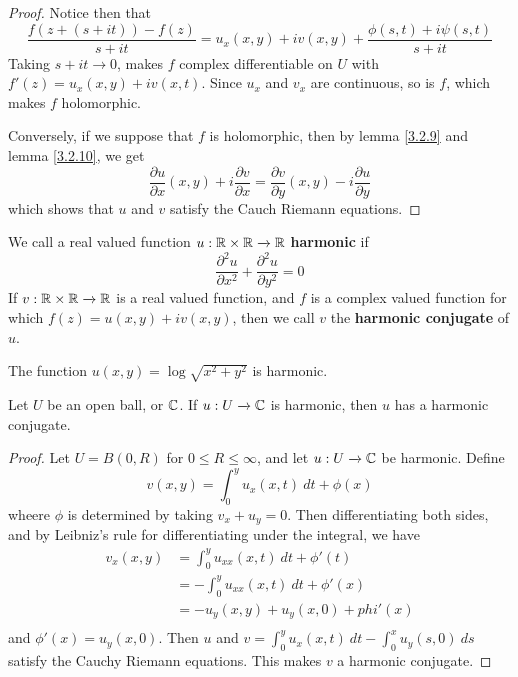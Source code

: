 \begin{proof}
    Notice then that
    \begin{equation*}
        \frac{f(z+(s+it))-f(z)}{s+it}=u_x(x,y)+iv(x,y)+\frac{\phi(s,t)+i\psi(s,t)}{s+it}
    \end{equation*}
    Taking $s+it \xrightarrow{} 0$, makes $f$ complex differentiable on $U$ with
    $f'(z)=u_x(x,y)+iv(x,t)$. Since $u_x$ and  $v_x$ are continuous, so is  $f$,
    which makes  $f$ holomorphic.

    Conversely, if we suppose that  $f$ is holomorphic, then by lemma \ref{3.2.9}
    and lemma \ref {3.2.10}, we get
    \begin{equation*}
        \frac{\partial{u}}{\partial{x}}(x,y)+i\frac{\partial{v}}{\partial{x}}=
        \frac{\partial{v}}{\partial{y}}(x,y)-i\frac{\partial{u}}{\partial{y}}
    \end{equation*}
    which shows that $u$ and  $v$ satisfy the Cauch Riemann equations.
\end{proof}

\begin{definition}
    We call a real valued function $u:\mathbb{R} \times \mathbb{R} \xrightarrow{} \mathbb{R}$
    \textbf{harmonic} if
    \begin{equation*}
        \frac{\partial^2{u}}{\partial{x}^2}+\frac{\partial^2{u}}{\partial{y}^2}=0
    \end{equation*}
    If $v:\mathbb{R} \times \mathbb{R} \xrightarrow{} \mathbb{R}$ is a real valued function, and $f$ is
    a complex valued function for which  $f(z)=u(x,y)+iv(x,y)$, then we call
    $v$ the  \textbf{harmonic conjugate} of $u$.
\end{definition}

\begin{example}\label{example_3.7}
    The function $u(x,y)=\log{\sqrt{x^2+y^2}}$ is harmonic.
\end{example}

\begin{theorem}\label{3.2.12}
    Let $U$ be an open ball, or $\mathbb{C}$. If $u:U \xrightarrow{} \mathbb{C}$ is harmonic,
    then $u$ has a harmonic conjugate.
\end{theorem}
\begin{proof}
    Let $U=B(0,R)$ for $0 \leq R \leq \infty$, and let  $u:U \xrightarrow{} \mathbb{C}$
    be harmonic. Define
    \begin{equation*}
        v(x,y)=\int_0^y{u_x(x,t) \ dt}+\phi(x)
    \end{equation*}
    wheere $\phi$ is determined by taking  $v_x+u_y=0$. Then differentiating
    both sides, and by Leibniz's rule for differentiating under the integral,
    we have
    \begin{align*}
        v_x(x,y) &= \int_0^y{u_{xx}(x,t) \ dt}+\phi'(t) \\
                 &= -\int_0^y{u_{xx}(x,t) \ dt}+\phi'(x)    \\
                 &= -u_y(x,y)+u_y(x,0)+phi'(x)  \\
    \end{align*}
    and $\phi'(x)=u_y(x,0)$. Then $u$ and  $v=\int_0^y{u_x(x,t) \ dt}-
    \int_0^x{u_y(s,0) \ ds}$ satisfy the Cauchy Riemann equations. This makes
    $v$ a harmonic conjugate.
\end{proof}
